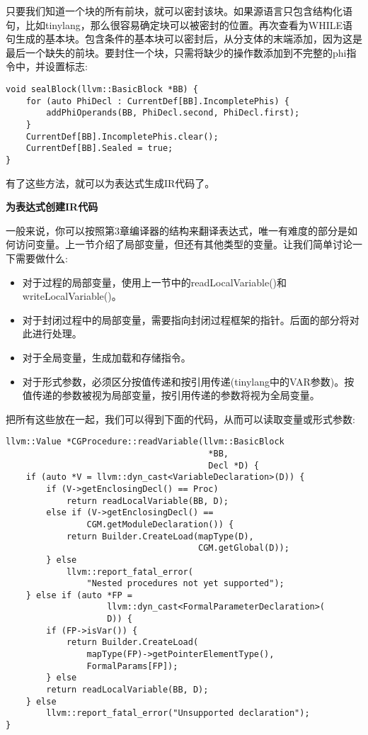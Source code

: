 只要我们知道一个块的所有前块，就可以密封该块。如果源语言只包含结构化语句，比如tinylang，那么很容易确定块可以被密封的位置。再次查看为WHILE语句生成的基本块。包含条件的基本块可以密封后，从分支体的末端添加，因为这是最后一个缺失的前块。要封住一个块，只需将缺少的操作数添加到不完整的phi指令中，并设置标志:\par

\begin{lstlisting}[caption={}]
void sealBlock(llvm::BasicBlock *BB) {
	for (auto PhiDecl : CurrentDef[BB].IncompletePhis) {
		addPhiOperands(BB, PhiDecl.second, PhiDecl.first);
	}
	CurrentDef[BB].IncompletePhis.clear();
	CurrentDef[BB].Sealed = true;
}
\end{lstlisting}

有了这些方法，就可以为表达式生成IR代码了。\par

\hspace*{\fill} \par %
\textbf{为表达式创建IR代码}

一般来说，你可以按照第3章编译器的结构来翻译表达式，唯一有难度的部分是如何访问变量。上一节介绍了局部变量，但还有其他类型的变量。让我们简单讨论一下需要做什么:\par

\begin{itemize}
\item 对于过程的局部变量，使用上一节中的readLocalVariable()和writeLocalVariable()。
\item 对于封闭过程中的局部变量，需要指向封闭过程框架的指针。后面的部分将对此进行处理。
\item 对于全局变量，生成加载和存储指令。
\item 对于形式参数，必须区分按值传递和按引用传递(tinylang中的VAR参数)。按值传递的参数被视为局部变量，按引用传递的参数将视为全局变量。
\end{itemize}

把所有这些放在一起，我们可以得到下面的代码，从而可以读取变量或形式参数:\par

\begin{lstlisting}[caption={}]
llvm::Value *CGProcedure::readVariable(llvm::BasicBlock
										*BB,
										Decl *D) {
	if (auto *V = llvm::dyn_cast<VariableDeclaration>(D)) {
		if (V->getEnclosingDecl() == Proc)
			return readLocalVariable(BB, D);
		else if (V->getEnclosingDecl() ==
				CGM.getModuleDeclaration()) {
			return Builder.CreateLoad(mapType(D),
									  CGM.getGlobal(D));
		} else
			llvm::report_fatal_error(
				"Nested procedures not yet supported");
	} else if (auto *FP =
					llvm::dyn_cast<FormalParameterDeclaration>(
					D)) {
		if (FP->isVar()) {
			return Builder.CreateLoad(
				mapType(FP)->getPointerElementType(),
				FormalParams[FP]);
		} else
		return readLocalVariable(BB, D);
	} else
		llvm::report_fatal_error("Unsupported declaration");
}
\end{lstlisting}

